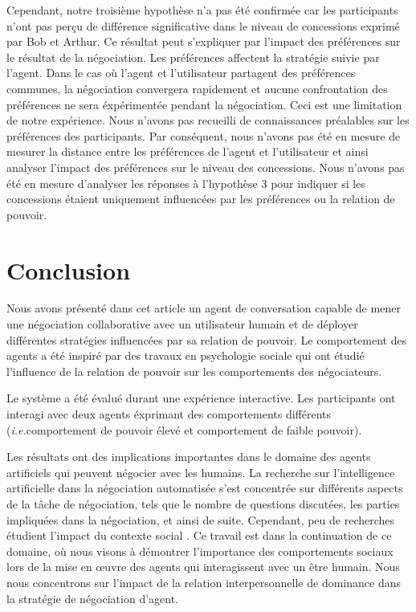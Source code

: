\documentclass [french]{sig-alternate-05-2015}
\begin{document}
{			Cependant, notre troisième hypothèse n'a pas été confirmée car les participants n'ont pas perçu de différence significative dans le niveau de concessions exprimé par Bob et Arthur. Ce résultat peut s'expliquer par l'impact des préférences sur le résultat de la négociation. Les préférences affectent la stratégie suivie par l'agent. Dans le cas où l'agent et l'utilisateur partagent des préférences communes, la négociation convergera rapidement et aucune confrontation des préférences ne sera éxpérimentée pendant la négociation. Ceci est une limitation de notre expérience. Nous n'avons pas recueilli de connaissances préalables sur les préférences des participants. Par conséquent, nous n'avons pas été en mesure de mesurer la distance entre les préférences de l'agent et l'utilisateur et ainsi analyser l'impact des préférences sur le niveau des concessions.
			Nous n'avons pas été en mesure d'analyser les réponses à l'hypothèse 3 pour indiquer si les concessions étaient uniquement influencées par les préférences ou la relation de pouvoir.
			
			
	\section{Conclusion}
	Nous avons présenté dans cet article un agent de conversation capable de mener une négociation collaborative avec un utilisateur humain et de déployer différentes stratégies influencées par sa relation de pouvoir. Le comportement des agents a été inspiré par des travaux en psychologie sociale qui ont étudié l'influence de la relation de pouvoir sur les comportements des négociateurs.
	
	Le système a été évalué durant une expérience interactive. Les participants ont interagi avec deux agents éxprimant des comportements différents (\textit {i.e.}comportement de pouvoir élevé et comportement de faible pouvoir).
	
	Les résultats ont des implications importantes dans le domaine des agents artificiels qui peuvent négocier avec les humains. La recherche sur l'intelligence artificielle dans la négociation automatisée s'est concentrée sur différents aspects de la tâche de négociation, tels que le nombre de questions discutées, les parties impliquées dans la négociation, et ainsi de suite. Cependant, peu de recherches étudient l'impact du contexte social \cite {de2011effect, nazari2015opponent}. Ce travail est dans la continuation de ce domaine, où nous visons à démontrer l'importance des comportements sociaux lors de la mise en œuvre des agents qui interagissent avec un être humain. Nous nous concentrons sur l'impact de la relation interpersonnelle de dominance dans la stratégie de négociation d'agent.
	
}
\end{document}
